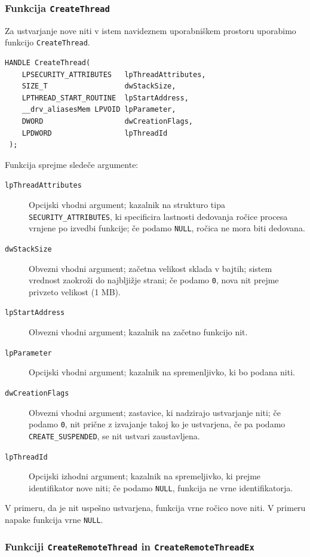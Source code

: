 \documentclass[a4paper,12pt,openright]{book}
\begin{document}
\subsubsection{Funkcija \texttt{CreateThread}}

Za ustvarjanje nove niti v istem navideznem uporabniškem prostoru uporabimo funkcijo \texttt{CreateThread}.

\begin{lstlisting}[style=func]
 HANDLE CreateThread(
	LPSECURITY_ATTRIBUTES   lpThreadAttributes,
	SIZE_T                  dwStackSize,
	LPTHREAD_START_ROUTINE  lpStartAddress,
	__drv_aliasesMem LPVOID lpParameter,
	DWORD                   dwCreationFlags,
	LPDWORD                 lpThreadId
 );
\end{lstlisting}

Funkcija sprejme sledeče argumente:
\begin{description}
	\item[\texttt{lpThreadAttributes}] Opcijski vhodni argument; kazalnik na strukturo tipa \texttt{SECURITY\_ATTRIBUTES}, ki specificira lastnosti dedovanja ročice procesa vrnjene po izvedbi funkcije; če podamo \texttt{NULL}, ročica ne mora biti dedovana.
	\item[\texttt{dwStackSize}] Obvezni vhodni argument; začetna velikost sklada v bajtih; sistem vrednost zaokroži do najbljižje strani; če podamo \texttt{0}, nova nit prejme privzeto velikost (1 MB).
	\item[\texttt{lpStartAddress}] Obvezni vhodni argument; kazalnik na začetno funkcijo nit.
	\item[\texttt{lpParameter}] Opcijski vhodni argument; kazalnik na spremenljivko, ki bo podana niti.
	\item[\texttt{dwCreationFlags}] Obvezni vhodni argument; zastavice, ki nadzirajo ustvarjanje niti; če podamo \texttt{0}, nit prične z izvajanje takoj ko je ustvarjena, če pa podamo \texttt{CREATE\_SUSPENDED}, se nit ustvari zaustavljena.
	\item[\texttt{lpThreadId}] Opcijski izhodni argument; kazalnik na spremeljivko, ki prejme identifikator nove niti; če podamo \texttt{NULL}, funkcija ne vrne identifikatorja.
\end{description}

V primeru, da je nit uspešno ustvarjena, funkcija vrne ročico nove niti.
V primeru napake funkcija vrne \texttt{NULL}.

\subsubsection{Funkciji \texttt{CreateRemoteThread} in \texttt{CreateRemoteThreadEx}}
\end{document}
